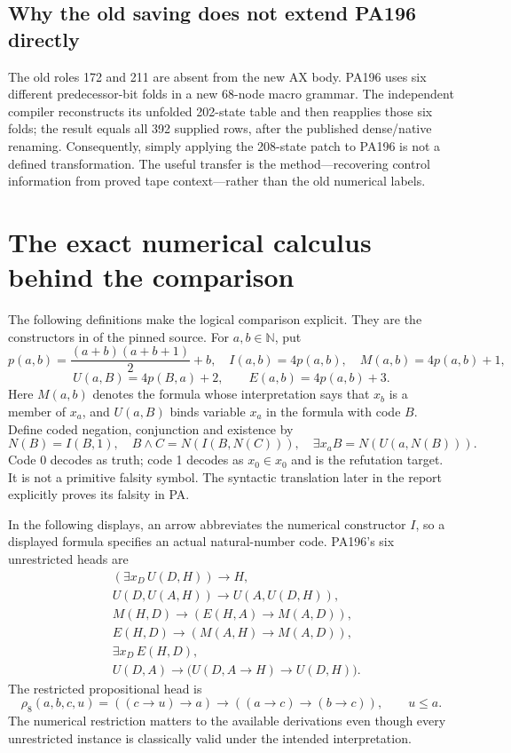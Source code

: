 \documentclass[11pt,a4paper]{article}
\begin{document}
\subsection{Why the old saving does not extend PA196 directly}

The old roles 172 and 211 are absent from the new AX body. PA196 uses six
different predecessor-bit folds in a new 68-node macro grammar. The
independent compiler reconstructs its unfolded 202-state table and then
reapplies those six folds; the result equals all 392 supplied rows,
after the published dense/native renaming. Consequently, simply applying
the 208-state patch to PA196 is not a defined transformation. The useful
transfer is the method---recovering control information from proved tape
context---rather than the old numerical labels.



\section{The exact numerical calculus behind the comparison}

The following definitions make the logical comparison explicit. They are
the constructors in  of the pinned source.
For $a,b\in\mathbb N$, put
\[
 p(a,b)=\frac{(a+b)(a+b+1)}2+b,
 \quad I(a,b)=4p(a,b),\quad M(a,b)=4p(a,b)+1,
\]
\[
 U(a,B)=4p(B,a)+2,\qquad E(a,b)=4p(a,b)+3.
\]
Here $M(a,b)$ denotes the formula whose interpretation says that $x_b$
is a member of $x_a$, and $U(a,B)$ binds variable $x_a$ in the formula
with code $B$. Define coded negation, conjunction and existence by
\[
 N(B)=I(B,1),\quad B\wedge C=N(I(B,N(C))),\quad
 \exists x_a B=N(U(a,N(B))).
\]
Code 0 decodes as truth; code 1 decodes as $x_0\in x_0$ and is the
refutation target. It is not a primitive falsity symbol. The syntactic
translation later in the report explicitly proves its falsity in PA.

In the following displays, an arrow abbreviates the numerical constructor
$I$, so a displayed formula specifies an actual natural-number code.
PA196's six unrestricted heads are
\begin{align*}
 & (\exists x_D\,U(D,H))\to H,\\
 & U(D,U(A,H))\to U(A,U(D,H)),\\
 & M(H,D)\to(E(H,A)\to M(A,D)),\\
 & E(H,D)\to(M(A,H)\to M(A,D)),\\
 & \exists x_D\,E(H,D),\\
 & U(D,A)\to\bigl(U(D,A\to H)\to U(D,H)\bigr).
\end{align*}
The restricted propositional head is
\[
 \rho_8(a,b,c,u)=((c\to u)\to a)\to((a\to c)\to(b\to c)),
 \qquad u\le a.
\]
The numerical restriction matters to the available derivations even
though every unrestricted instance is classically valid under the
intended interpretation.
\end{document}

